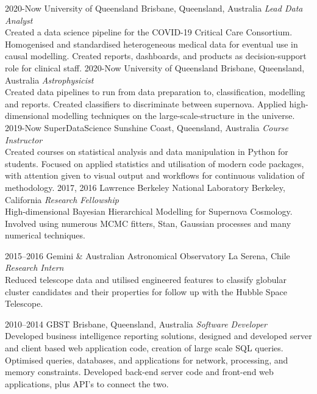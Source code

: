 \documentclass[]{friggeri-cv2}
\begin{document}
\begin{entrylist}
\entry
{2020-Now}
{University of Queensland}
{Brisbane, Queensland, Australia}
{\emph{Lead Data Analyst} \\
Created a data science pipeline for the COVID-19 Critical Care Consortium. Homogenised and standardised heterogeneous medical data for eventual use in causal modelling. Created reports, dashboards, and products as decision-support role for clinical staff.}
\entry
{2020-Now}
{University of Queensland}
{Brisbane, Queensland, Australia}
{\emph{Astrophysicist} \\
Created data pipelines to run from data preparation to, classification, modelling and reports. Created classifiers to discriminate between supernova. Applied high-dimensional modelling techniques on the large-scale-structure in the universe.}
\entry
{2019-Now}
{SuperDataScience}
{Sunshine Coast, Queensland, Australia}
{\emph{Course Instructor} \\
Created courses on statistical analysis and data manipulation in Python for students. Focused on applied statistics and utilisation of modern code packages, with attention given to visual output and workflows for continuous validation of methodology.}
\entry
{2017, 2016}
{Lawrence Berkeley National Laboratory}
{Berkeley, California}
{\emph{Research Fellowship} \\
High-dimensional Bayesian Hierarchical Modelling for Supernova Cosmology. Involved using numerous MCMC fitters, Stan, Gaussian processes and many numerical techniques.}


\entry
{2015--2016}
{Gemini \& Australian Astronomical Observatory}
{La Serena, Chile}
{\emph{Research Intern} \\
Reduced telescope data and utilised engineered features to classify globular cluster candidates and their properties for follow up with the Hubble Space Telescope.}

\entry
{2010--2014}
{GBST}
{Brisbane, Queensland, Australia}
{\emph{Software Developer} \\
Developed business intelligence reporting solutions, designed and developed server and client based web application code, creation of large scale SQL queries. Optimised queries, databases, and applications for network, processing, and memory constraints. Developed back-end server code and front-end web applications, plus API's to connect the two.}

\end{entrylist}

\end{document}
